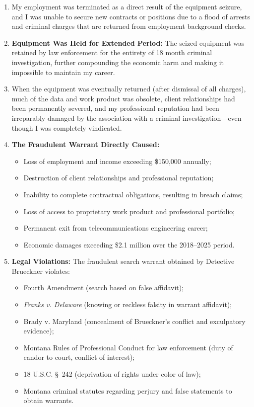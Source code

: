 \documentclass[12pt,letterpaper]{article}
\begin{document}
\begin{enumerate}
\item My employment was terminated as a direct result of the equipment seizure, and I was unable to secure new contracts or positions due to a flood of arrests and criminal charges that are returned from employment background checks.

\item \textbf{Equipment Was Held for Extended Period:} The seized equipment was retained by law enforcement for the entirety of 18 month criminal investigation, further compounding the economic harm and making it impossible to maintain my career.

\item When the equipment was eventually returned (after dismissal of all charges), much of the data and work product was obsolete, client relationships had been permanently severed, and my professional reputation had been irreparably damaged by the association with a criminal investigation---even though I was completely vindicated.

\item \textbf{The Fraudulent Warrant Directly Caused:}

\begin{itemize}
\item Loss of employment and income exceeding \$150,000 annually;
\item Destruction of client relationships and professional reputation;
\item Inability to complete contractual obligations, resulting in breach claims;
\item Loss of access to proprietary work product and professional portfolio;
\item Permanent exit from telecommunications engineering career;
\item Economic damages exceeding \$2.1 million over the 2018--2025 period.
\end{itemize}

\item \textbf{Legal Violations:} The fraudulent search warrant obtained by Detective Brueckner violates:

\begin{itemize}
\item Fourth Amendment (search based on false affidavit);
\item \textit{Franks v. Delaware} (knowing or reckless falsity in warrant affidavit);
\item Brady v. Maryland (concealment of Brueckner's conflict and exculpatory evidence);
\item Montana Rules of Professional Conduct for law enforcement (duty of candor to court, conflict of interest);
\item 18 U.S.C. \S~242 (deprivation of rights under color of law);
\item Montana criminal statutes regarding perjury and false statements to obtain warrants.
\end{itemize}

\end{enumerate}
\end{document}
